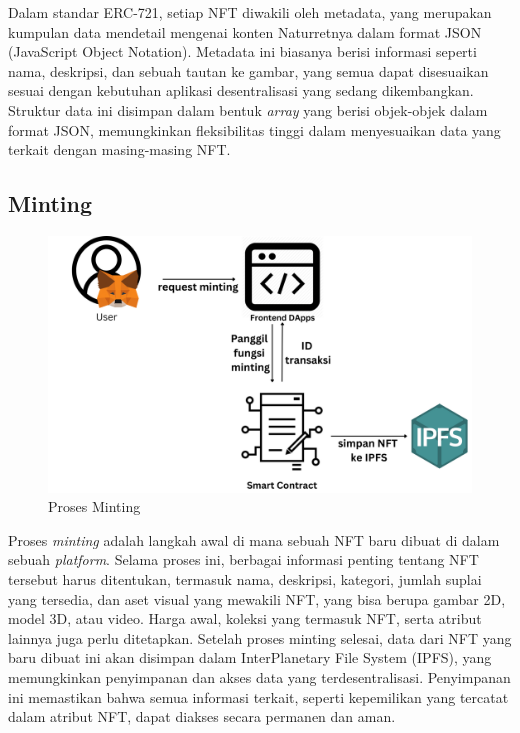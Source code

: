 

Dalam standar ERC-721, setiap NFT diwakili oleh metadata, yang merupakan kumpulan data mendetail mengenai konten Naturretnya dalam format JSON (JavaScript Object Notation). Metadata ini biasanya berisi informasi seperti nama, deskripsi, dan sebuah tautan ke gambar, yang semua dapat disesuaikan sesuai dengan kebutuhan aplikasi desentralisasi yang sedang dikembangkan. Struktur data ini disimpan dalam bentuk \emph{array} yang berisi objek-objek dalam format JSON, memungkinkan fleksibilitas tinggi dalam menyesuaikan data yang terkait dengan masing-masing NFT.

\subsection{Minting}
\begin{figure} [H] \centering
  \includegraphics[scale=0.25]{gambar/proses_minting.png}
  \caption{Proses Minting}
  \label{fig:prosesminting}
\end{figure}


Proses \emph{minting} adalah langkah awal di mana sebuah NFT baru dibuat di dalam sebuah \emph{platform}. Selama proses ini, berbagai informasi penting tentang NFT tersebut harus ditentukan, termasuk nama, deskripsi, kategori, jumlah suplai yang tersedia, dan aset visual yang mewakili NFT, yang bisa berupa gambar 2D, model 3D, atau video. Harga awal, koleksi yang termasuk NFT, serta atribut lainnya juga perlu ditetapkan. Setelah proses minting selesai, data dari NFT yang baru dibuat ini akan disimpan dalam InterPlanetary File System (IPFS), yang memungkinkan penyimpanan dan akses data yang terdesentralisasi. Penyimpanan ini memastikan bahwa semua informasi terkait, seperti kepemilikan yang tercatat dalam atribut NFT, dapat diakses secara permanen dan aman.

